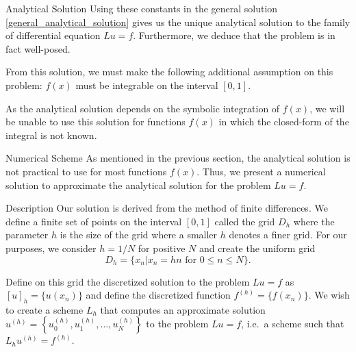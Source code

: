 \documentclass{article}
\begin{document}
\begin{section}{Analytical Solution}
  Using these constants in the general solution \eqref{general_analytical_solution}
  gives us the unique analytical solution to the family of differential equation $Lu = f$.
  Furthermore, we deduce that the problem is in fact well-posed.

  From this solution, we must make the following additional assumption on this
  problem: $f(x)$ must be integrable on the interval $[0, 1]$.

  As the analytical solution depends on the symbolic integration of $f(x)$, we
  will be unable to use this solution for functions $f(x)$ in which the
  closed-form of the integral is not known.
\end{section}


\begin{section}{Numerical Scheme}\label{sec:scheme}
  As mentioned in the previous section, the analytical solution is not practical
  to use for most functions $f(x)$. Thus, we present a numerical solution to
  approximate the analytical solution for the problem $Lu = f$.

  \begin{subsection}{Description}
    Our solution is derived from the method of finite differences. We define
    a finite set of points on the interval $[0, 1]$ called the grid $D_h$ where
    the parameter $h$ is the size of the grid where a smaller $h$ denotes a finer
    grid. For our purposes, we consider $h=1/N$ for positive $N$ and
    create the uniform grid
    \[
      D_h = \{x_n| x_n = hn \text{ for $0 \leq n \leq N$}\}.
    \]

    Define on this grid the discretized solution to the problem $Lu = f$ as
    $[u]_h = \{u(x_n)\}$ and define the discretized function $f^{(h)} = \{f(x_n)\}$.
    We wish to create a scheme $L_h$ that computes an approximate solution
    $u^{(h)} = \left\{u_0^{(h)}, u_1^{(h)}, \dots, u_N^{(h)}\right\}$ to the problem
    $Lu = f$, i.e.\ a scheme such that $L_h u^{(h)} = f^{(h)}$.


\end{subsection}
\end{section}
\end{document}
